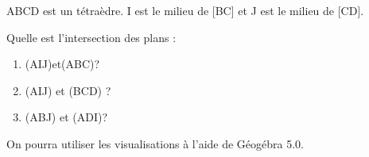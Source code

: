 
ABCD est un tétraèdre. I est le milieu de [BC] et J est le milieu de [CD].
 
Quelle est l'intersection des plans :
\begin{enumerate}
\item (AIJ)et(ABC)? 
\item (AIJ) et (BCD) ? 
\item (ABJ) et (ADI)?
\end{enumerate}
On pourra utiliser les visualisations à l'aide de Géogébra 5.0.